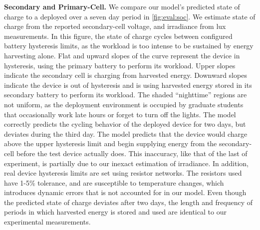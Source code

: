 
\vspace{-6pt}
\noindent
\textbf{Secondary and Primary-Cell.}
We compare our model's predicted state of charge to a deployed \name over a seven
day period in \cref{fig:eval:soc}. We estimate state of charge from the reported secondary-cell
voltage,
and irradiance from
lux measurements. In this figure, the state of
charge cycles between configured battery hysteresis limits, as the workload is
too intense to be sustained by energy harvesting alone.
Flat and upward slopes of the curve represent the
device in hysteresis, using the primary battery to perform its workload. Upper slopes
indicate the secondary cell is charging from harvested energy.
Downward slopes indicate the device is out of hysteresis and is using harvested
energy stored in its secondary battery to perform its workload.
The shaded ``nighttime'' regions are not uniform, as the
deployment environment is occupied by graduate students that occasionally work
late hours or forget to turn off the lights.  The model correctly predicts the
cycling
behavior of the deployed device for two days, but deviates
during the third day. The model predicts that the device would charge above the upper
hysteresis limit and begin supplying energy from the secondary-cell before the
test device actually does.  This inaccuracy, like that of the last of
experiment, is partially due to our inexact estimation of irradiance.  In
addition, real device hysteresis limits are set using resistor networks.  The
resistors used have 1-5\% tolerance, and are susceptible to temperature
changes, which introduces dynamic errors that is not accounted for in our model.
Even though the predicted state of charge deviates after two days, the length
and frequency of periods in which harvested energy is stored and used %
are identical to our experimental measurements.
